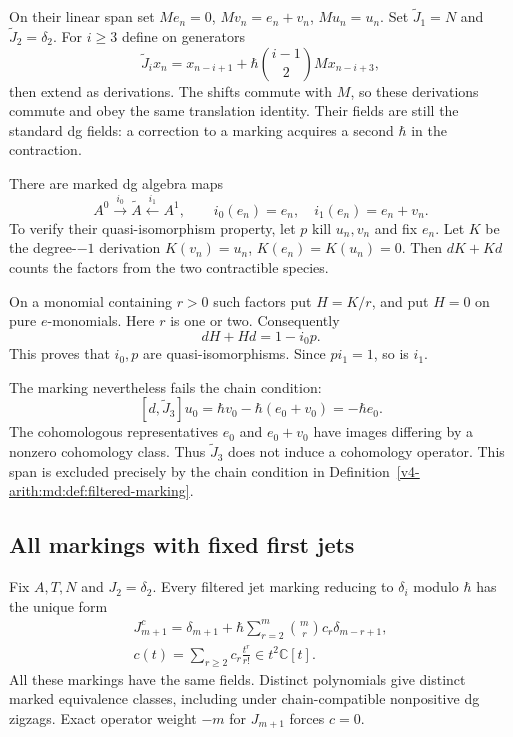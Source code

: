 On their linear span set
$Me_n=0$, $Mv_n=e_n+v_n$, $Mu_n=u_n$.
Set $\widetilde J_1=N$ and
$\widetilde J_2=\delta_2$. For $i\geq3$
define on generators
\[
 \widetilde J_i x_n=x_{n-i+1}
   +\hbar\binom{i-1}{2}Mx_{n-i+3},
\]
then extend as derivations.
The shifts commute with $M$, so these
derivations commute and obey the same
translation identity. Their fields are still
the standard dg fields: a correction to a
marking acquires a second $\hbar$ in the
contraction.

There are marked dg algebra maps
\[
 A^0\xrightarrow{i_0}\widetilde A
 \xleftarrow{i_1}A^1,\qquad
 i_0(e_n)=e_n,\quad i_1(e_n)=e_n+v_n.
\]
To verify their quasi-isomorphism property,
let $p$ kill $u_n,v_n$ and fix $e_n$.
Let $K$ be the degree-$-1$ derivation
$K(v_n)=u_n$, $K(e_n)=K(u_n)=0$.
Then $dK+Kd$ counts the factors from the
two contractible species.

On a monomial containing $r>0$ such factors
put $H=K/r$, and put $H=0$ on pure
$e$-monomials. Here $r$ is one or two.
Consequently
\[
 dH+Hd=1-i_0p.
\]
This proves that $i_0,p$ are quasi-isomorphisms.
Since $pi_1=1$, so is $i_1$.

The marking nevertheless fails the chain
condition:
\begin{equation}\label{v4-arith:md:eq:chain-defect}
 [d,\widetilde J_3]u_0
 =\hbar v_0-\hbar(e_0+v_0)=-\hbar e_0.
\end{equation}
The cohomologous representatives $e_0$
and $e_0+v_0$ have images differing by a
nonzero cohomology class. Thus $\widetilde J_3$
does not induce a cohomology operator.
This span is excluded precisely by the
chain condition in
Definition~\ref{v4-arith:md:def:filtered-marking}.

\subsection{All markings with fixed first jets}

\begin{theorem}
\label{v4-arith:md:thm:moment-classification}
Fix $A,T,N$ and $J_2=\delta_2$.
Every filtered jet marking reducing to
$\delta_i$ modulo $\hbar$ has the unique form
\begin{equation}\label{v4-arith:md:eq:polynomial-moments}
 \begin{gathered}
 J_{m+1}^c=\delta_{m+1}
  +\hbar\sum_{r=2}^m\binom mr c_r\delta_{m-r+1},\\
 c(t)=\sum_{r\geq2}c_r\frac{t^r}{r!}
          \in t^2\mathbb C[t].
 \end{gathered}
\end{equation}
All these markings have the same fields.
Distinct polynomials give distinct marked
equivalence classes, including under
chain-compatible nonpositive dg zigzags.
Exact operator weight $-m$ for $J_{m+1}$
forces $c=0$.
\end{theorem}

